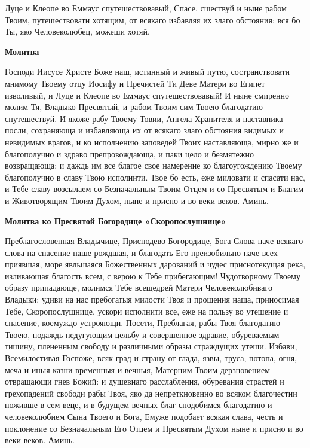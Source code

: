 Луце и Клеопе во Еммаус спутешествовавый, Спасе, сшествуй и ныне рабом Твоим, путешествовати хотящим, от всякаго избавляя их злаго обстояния: вся бо Ты, яко Человеколюбец, можеши хотяй.


\medskip\bfseries Молитва\normalfont{}\nopagebreak


Господи Иисусе Христе Боже наш, истинный и живый путю, состранствовати мнимому Твоему отцу Иосифу и Пречистей Ти Деве Матери во Египет изволивый, и Луце и Клеопе во Еммаус спутешествовавый! И ныне смиренно молим Тя, Владыко Пресвятый, и рабом Твоим сим Твоею благодатию спутешествуй. И якоже рабу Твоему Товии, Ангела Хранителя и наставника посли, сохраняюща и избавляюща их от всякаго злаго обстояния видимых и невидимых врагов, и ко исполнению заповедей Твоих наставляюща, мирно же и благополучно и здраво препровождающа, и паки цело и безмятежно возвращающа; и даждь им все благое свое намерение ко благоугождению Твоему благополучно в славу Твою исполнити. Твое бо есть, еже миловати и спасати нас, и Тебе славу возсылаем со Безначальным Твоим Отцем и со Пресвятым и Благим и Животворящим Твоим Духом, ныне и присно и во веки веков. Аминь.


\medskip\bfseries Молитва ко Пресвятой Богородице «Скоропослушнице»\normalfont{}\nopagebreak


Преблагословенная Владычице, Приснодево Богородице, Бога Слова паче всякаго слова на спасение наше рождшая, и благодать Его преизобильно паче всех приявшая, море явльшаяся Божественных дарований и чудес приснотекущая река, изливающая благость всем, с верою к Тебе прибегающим! Чудотворному Твоему образу припадающе, молимся Тебе всещедрей Матери Человеколюбиваго Владыки: удиви на нас пребогатыя милости Твоя и прошения наша, приносимая Тебе, Скоропослушнице, ускори исполнити все, еже на пользу во утешение и спасение, коемуждо устрояющи. Посети, Преблагая, рабы Твоя благодатию Твоею, подаждь недугующим цельбу и совершенное здравие, обуреваемым тишину, плененным свободу и различными образы страждущих утеши. Избави, Всемилостивая Госпоже, всяк град и страну от глада, язвы, труса, потопа, огня, меча и иныя казни временныя и вечныя, Матерним Твоим дерзновением отвращающи гнев Божий: и душевнаго расслабления, обуревания страстей и грехопадений свободи рабы Твоя, яко да непреткновенно во всяком благочестии поживше в сем веце, и в будущем вечных благ сподобимся благодатию и человеколюбием Сына Твоего и Бога, Емуже подобает всякая слава, честь и поклонение со Безначальным Его Отцем и Пресвятым Духом ныне и присно и во веки веков. Аминь.
\mychapterending

